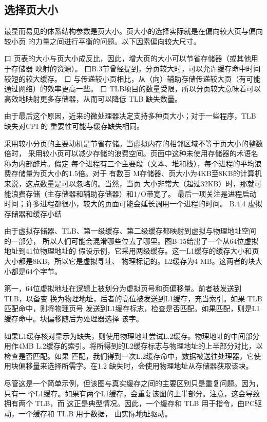\subsection{选择页大小}
最显而易见的体系结构参数是页大小。页大小的选择实际就是在偏向较大页与偏向较小页
的力量之间进行平衡的问题。以下因素偏向较大尺寸。

口 页表的大小与页大小成反比，因此，增大页的大小可以节省存储器（或其他用于存储器
映射的资源）。
口B.3节曾经提到，分页较大时，可以允许缓存命中时间较短的较大缓存。
口 与传递较小页相比，从（向）辅助存储传递较大页（有可能通过网络）的效率更高一些。
口 TLB项目的数量受限，所以分页较大意味着可以高效地映射更多存储器，从而可以降低
TLB 缺失数量。

由于最后这个原因，近来的微处理器决定支持多种页大小；对于一些程序，TLB缺失对CPI 的
重要性可能与缓存缺失相同。

采用较小分页的主要动机是节省存储。当虚拟内存的相邻区域不等于页大小的整数倍时，
采用较小页可以减少存储的浪费空间。页面中这种未使用存储器的术语名称为内部醉片。假定
每个进程有三个主要段（文本、堆和栈），每个进程的平均浪费存储量为页大小的1.5倍。对于
有数百 M存储器、页大小为4KB至8KB的计算机来说，这点数量是可以忽略的。当然，当页
大小非常大（超过32KB）时，那就可能浪费存储（主存储器和辅助存储器）和1/O带宽了。
最后一项关注是进程启动时间；许多进程都很小，较大的页面可能会延长调用一个进程的时间。
B.4.4 虚拟存储器和缓存小结

由于虚拟存储器、TLB、第一级缓存、第二级缓存都映射到虚拟与物理地址空间的一部分，
所以人们可能会混淆哪些位去了哪里。图B-15给出了一个从64位虚拟地址到41位物理地址的
假设示例，它采用两级缓存。这一L1缓存的缓存大小和页大小都是8KB，所以它是虚拟寻址、
物理标记的。L2缓存为4 MB。这两者的块大小都是64个字节。

第一，64位虚拟地址在逻辑上被划分为虚拟页号和页偏移量。前者被发送到TLB，以备变
换为物理地址，后者的高位被发送到L1缓存，充当索引。如果 TLB匹配命中，则将物理页号
发送到L1缓存标志，检查是否匹配。如果匹配，则是L1缓存命中。块偏移随后为处理器选择
该字。

如果L1缓存核对显示为缺失，则使用物理地址尝试L.2缓存。物理地址的中间部分用作4MB
L.2缓存的索引。将所得到的L2缓存标志与物理地址的上半部分对比，以检查是否匹配。如果
匹配，我们得到一次L.2缓存命中，数据被送往处理器，它使用块偏移量来选择所需字。在1.2
缺失时，会使用物理地址从存储器获取该块。

尽管这是一个简单示例，但该图与真实缓存之间的主要区别只是重复问题。因为，只有一
个L1缓存。如果有两个L1缓存，会重复该图的上半部分。注意，这会导致拥有两个 TLB，而
这正是典型情况。因此，一个缓存和 TLB 用于指令，由PC驱动，一个缓存和 TL.B 用于数据，
由实际地址驱动。

